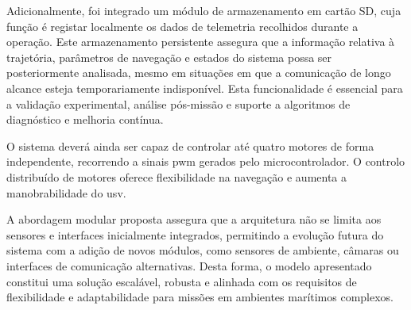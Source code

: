 Adicionalmente, foi integrado um módulo de armazenamento em cartão SD, cuja função é registar localmente os dados de telemetria recolhidos durante a operação. Este armazenamento persistente assegura que a informação relativa à trajetória, parâmetros de navegação e estados do sistema possa ser posteriormente analisada, mesmo em situações em que a comunicação de longo alcance esteja temporariamente indisponível. Esta funcionalidade é essencial para a validação experimental, análise pós-missão e suporte a algoritmos de diagnóstico e melhoria contínua.

O sistema deverá ainda ser capaz de controlar até quatro motores de forma independente, recorrendo a sinais \gls{pwm} gerados pelo microcontrolador. O controlo distribuído de motores oferece flexibilidade na navegação e aumenta a manobrabilidade do \gls{usv}.

A abordagem modular proposta assegura que a arquitetura não se limita aos sensores e interfaces inicialmente integrados, permitindo a evolução futura do sistema com a adição de novos módulos, como sensores de ambiente, câmaras ou interfaces de comunicação alternativas. Desta forma, o modelo apresentado constitui uma solução escalável, robusta e alinhada com os requisitos de flexibilidade e adaptabilidade para missões em ambientes marítimos complexos.
